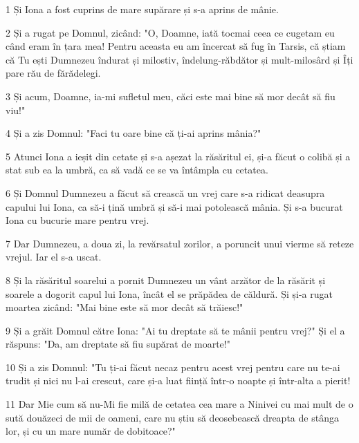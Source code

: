 \par 1 Și Iona a fost cuprins de mare supărare și s-a aprins de mânie.
\par 2 Și a rugat pe Domnul, zicând: "O, Doamne, iată tocmai ceea ce cugetam eu când eram în țara mea! Pentru aceasta eu am încercat să fug în Tarsis, că știam că Tu ești Dumnezeu îndurat și milostiv, îndelung-răbdător și mult-milosârd și Îți pare rău de fărădelegi.
\par 3 Și acum, Doamne, ia-mi sufletul meu, căci este mai bine să mor decât să fiu viu!"
\par 4 Și a zis Domnul: "Faci tu oare bine că ți-ai aprins mânia?"
\par 5 Atunci Iona a ieșit din cetate și s-a așezat la răsăritul ei, și-a făcut o colibă și a stat sub ea la umbră, ca să vadă ce se va întâmpla cu cetatea.
\par 6 Și Domnul Dumnezeu a făcut să crească un vrej care s-a ridicat deasupra capului lui Iona, ca să-i țină umbră și să-i mai potolească mânia. Și s-a bucurat Iona cu bucurie mare pentru vrej.
\par 7 Dar Dumnezeu, a doua zi, la revărsatul zorilor, a poruncit unui vierme să reteze vrejul. Iar el s-a uscat.
\par 8 Și la răsăritul soarelui a pornit Dumnezeu un vânt arzător de la răsărit și soarele a dogorit capul lui Iona, încât el se prăpădea de căldură. Și și-a rugat moartea zicând: "Mai bine este să mor decât să trăiesc!"
\par 9 Și a grăit Domnul către Iona: "Ai tu dreptate să te mânii pentru vrej?" Și el a răspuns: "Da, am dreptate să fiu supărat de moarte!"
\par 10 Și a zis Domnul: "Tu ți-ai făcut necaz pentru acest vrej pentru care nu te-ai trudit și nici nu l-ai crescut, care și-a luat ființă într-o noapte și într-alta a pierit!
\par 11 Dar Mie cum să nu-Mi fie milă de cetatea cea mare a Ninivei cu mai mult de o sută douăzeci de mii de oameni, care nu știu să deosebească dreapta de stânga lor, și cu un mare număr de dobitoace?"


